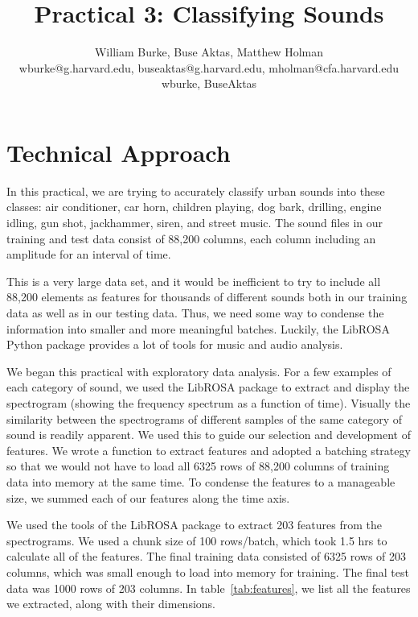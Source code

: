 \documentclass[11pt]{article}
\title{Practical 3: Classifying Sounds}
\author{William Burke, Buse Aktas, Matthew Holman \\ wburke@g.harvard.edu, buseaktas@g.harvard.edu, mholman@cfa.harvard.edu \\
wburke, BuseAktas}
\begin{document}
\maketitle{}



\section{Technical Approach}

In this practical, we are trying to accurately classify urban sounds into these classes: air conditioner, car horn, children playing, dog bark, drilling, engine idling, gun shot, jackhammer, siren, and street music. The sound files in our training and test data consist of 88,200 columns, each column including an amplitude for an interval of time. 

This is a very large data set, and it would be inefficient to try to include all 88,200 elements as features for thousands of different sounds both in our training data as well as in our testing data. Thus, we need some way to condense the information into smaller and more meaningful batches. Luckily, the LibROSA Python package provides a lot of tools for music and audio analysis. 

We began this practical with exploratory data analysis.  For a few examples of each category of sound, we used the LibROSA package to extract and display the spectrogram (showing the frequency spectrum as a function of time).  Visually the similarity between the spectrograms of different samples of the same category of sound is readily apparent.  We used this to guide our selection and development of features. We wrote a function to extract features and adopted a batching strategy so that we would not have to load all 6325 rows of 88,200 columns of training data into memory at the same time. To condense the features to a manageable size, we summed each of our features along the time axis.

We used the tools of the LibROSA package to extract 203 features from the spectrograms. We used a chunk size of 100 rows/batch, which took 1.5 hrs to calculate all of the features. The final training data consisted of 6325 rows of 203 columns, which was small enough to load into memory for training. The final test data was 1000 rows of 203 columns. In table~\ref{tab:features}, we list all the features we extracted, along with their dimensions. 
\end{document}
